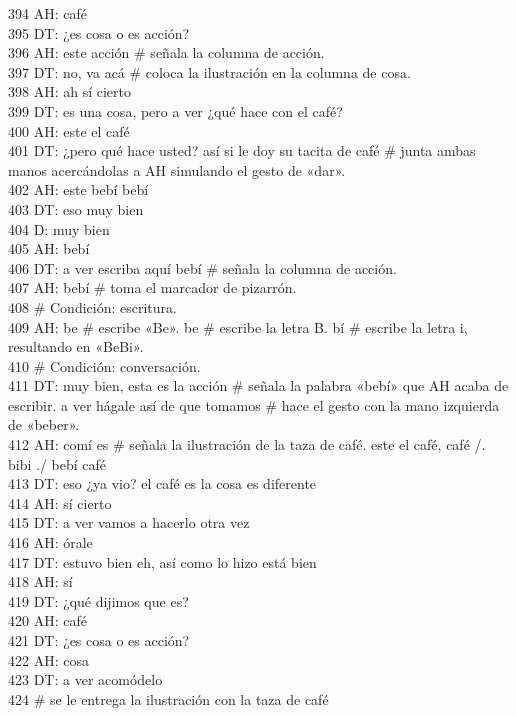 394 AH: café\\
395 DT: ¿es cosa o es acción?\\
396 AH: este acción # señala la columna de acción.\\
397 DT: no, va acá # coloca la ilustración en la columna de cosa.\\
398 AH: ah sí cierto\\
399 DT: es una cosa, pero a ver ¿qué hace con el café?\\
400 AH: este el café\\
401 DT: ¿pero qué hace usted? así si le doy su tacita de café # junta ambas manos acercándolas a AH simulando el gesto de «dar».\\
402 AH: este bebí bebí\\
403 DT: eso muy bien\\
404 D: muy bien\\
405 AH: bebí\\
406 DT: a ver escriba aquí bebí # señala la columna de acción.\\
407 AH: bebí # toma el marcador de pizarrón.\\
408 # Condición: escritura.\\
409 AH: be # escribe «Be». be # escribe la letra B. bí # escribe la letra i, resultando en «BeBi».\\
410 # Condición: conversación.\\
411 DT: muy bien, esta es la acción # señala la palabra «bebí» que AH acaba de escribir. a ver hágale así de que tomamos # hace el gesto con la mano izquierda de «beber».\\
412 AH: comí es # señala la ilustración de la taza de café. este el café, café /. bibi ./ bebí café\\
413 DT: eso ¿ya vio? el café es la cosa es diferente\\
414 AH: sí cierto\\
415 DT: a ver vamos a hacerlo otra vez\\
416 AH: órale\\
417 DT: estuvo bien eh, así como lo hizo está bien\\
418 AH: sí\\
419 DT: ¿qué dijimos que es?\\
420 AH: café\\
421 DT: ¿es cosa o es acción?\\
422 AH: cosa\\
423 DT: a ver acomódelo\\
424 # se le entrega la ilustración con la taza de café\\
